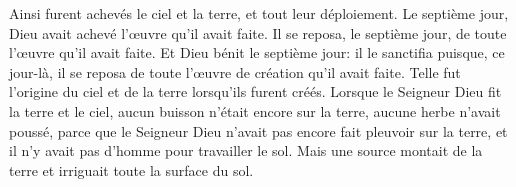 Ainsi furent achevés le ciel et la terre, et tout leur déploiement.
Le septième jour, Dieu avait achevé l’œuvre qu’il avait faite.
Il se reposa, le septième jour, de toute l’œuvre qu’il avait faite.
Et Dieu bénit le septième jour: il le sanctifia puisque, ce jour-là,
	il se reposa de toute l’œuvre de création qu’il avait faite.
Telle fut l’origine du ciel et de la terre lorsqu’ils furent créés.
Lorsque le Seigneur Dieu fit la terre et le ciel,
	aucun buisson n’était encore sur la terre, aucune herbe n’avait poussé,
	parce que le Seigneur Dieu n’avait pas encore fait pleuvoir sur la terre,
	et il n’y avait pas d’homme pour travailler le sol.
Mais une source montait de la terre et irriguait toute la surface du sol.